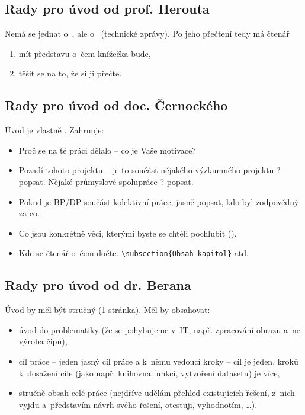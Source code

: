 \begin{samepage}
\subsection*{Rady pro úvod od prof. Herouta}
Nemá se jednat o~, ale o~ (technické zprávy). Po jeho přečtení tedy má čtenář 
\begin{enumerate}
  \item{mít představu o~čem knížečka bude,}
  \item{těšit se na to, že si ji přečte.}
\end{enumerate}
\end{samepage}

\subsection*{Rady pro úvod od doc. Černockého}

Úvod je vlastně . Zahrnuje:

\begin{itemize}
  \item{Proč se na té práci dělalo -- co je Vaše motivace?}
  \item{Pozadí tohoto projektu -- je to součást nějakého výzkumného projektu ? popsat. Nějaké průmyslové spolupráce ? popsat.}
  \item{Pokud je BP/DP součást kolektivní práce, jasně popsat, kdo byl zodpovědný za co.}
  \item{Co jsou konkrétně věci, kterými byste se chtěli pochlubit ().}
  \item{Kde se čtenář o~čem dočte. \texttt{\textbackslash subsection\{Obsah kapitol\}} atd.}
\end{itemize}

\subsection*{Rady pro úvod od dr. Berana}

Úvod by měl být stručný (1 stránka). Měl by obsahovat:
\begin{itemize}
  \item{úvod do problematiky (že se pohybujeme v~IT, např. zpracování obrazu a~ne výroba čipů),}
  \item{cíl práce -- jeden jasný cíl práce a k~němu vedoucí kroky -- cíl je jeden, kroků k~dosažení cíle (jako např. knihovna funkcí, vytvoření datasetu) je více,}
  \item{stručně obsah celé práce (nejdříve udělám přehled existujících řešení, z~nich vyjdu a~představím návrh svého řešení, otestuji, vyhodnotím, \ldots).}
\end{itemize}



